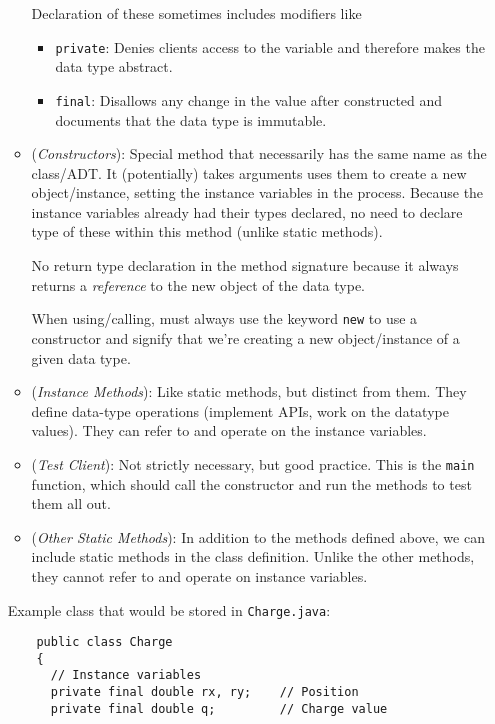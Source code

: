 \documentclass[12pt]{article}
\theoremstyle{plain}
\theoremstyle{definition}
\theoremstyle{remark}
\begin{document}
\begin{itemize}
\begin{itemize}
        Declaration of these sometimes includes modifiers like
        \begin{itemize}
          \item \texttt{private}: Denies clients access to the variable
            and therefore makes the data type abstract.
          \item \texttt{final}: Disallows any change in the value after
            constructed and documents that the data type is immutable.
        \end{itemize}

      \item (\emph{Constructors}):
        Special method that necessarily has the same name as the
        class/ADT.
        It (potentially) takes arguments uses them to create a new
        object/instance, setting the instance variables in the process.
        Because the instance variables already had their types declared,
        no need to declare type of these within this method (unlike
        static methods).

        No return type declaration in the method signature because it
        always returns a \emph{reference} to the new object of the data
        type.

        When using/calling, must always use the keyword \texttt{new} to
        use a constructor and signify that we're creating a new
        object/instance of a given data type.

      \item (\emph{Instance Methods}): Like static methods, but distinct
        from them.
        They define data-type operations (implement APIs, work on the
        datatype values).
        They can refer to and operate on the instance variables.

      \item (\emph{Test Client}): Not strictly necessary, but good
        practice.
        This is the \texttt{main} function, which should call the
        constructor and run the methods to test them all out.

      \item (\emph{Other Static Methods}):
        In addition to the methods defined above, we can include static
        methods in the class definition.
        Unlike the other methods, they cannot refer to and operate on
        instance variables.
    \end{itemize}
    Example class that would be stored in \texttt{Charge.java}:
    \begin{lstlisting}
    public class Charge
    {
      // Instance variables
      private final double rx, ry;    // Position
      private final double q;         // Charge value


\end{lstlisting}
\end{itemize}
\end{document}
